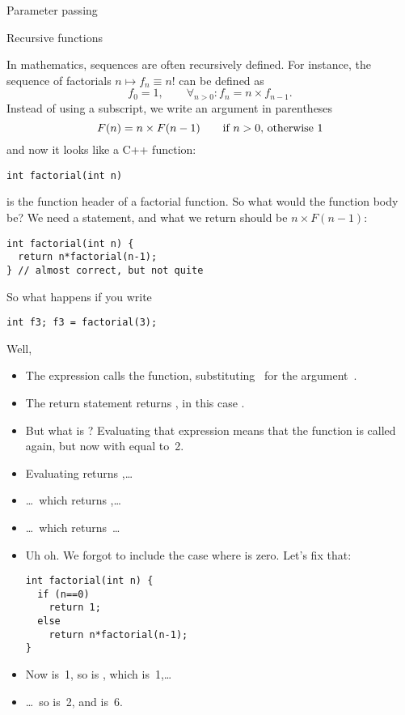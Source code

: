  {Parameter passing}
\label{sec:passing}


 {Recursive functions}
\label{sec:recursion}

In mathematics, sequences are often recursively defined. For instance,
the sequence of factorials $n\mapsto f_n\equiv n!$ can be defined as
\[ f_0=1,\qquad \forall_{n>0}\colon f_n=n\times f_{n-1}. \]
Instead of using a subscript, we write an argument in parentheses
\[ F(n) = n \times F(n-1) \qquad \hbox{if $n>0$, otherwise~$1$} \]
and now it looks like a C++ function:
\begin{verbatim}
int factorial(int n)
\end{verbatim}
is the function header of a factorial function. So what would the
function body be? We need a  statement, and what we return
should be $n \times F(n-1)$:
\begin{verbatim}
int factorial(int n) {
  return n*factorial(n-1);
} // almost correct, but not quite
\end{verbatim}
So what happens if you write
\begin{verbatim}
int f3; f3 = factorial(3);
\end{verbatim}
Well,
\begin{itemize}
\item The expression  calls the 
  function, substituting~ for the argument~.
\item The return statement returns , in this case
  .
\item But what is ? Evaluating that expression means
  that the  function is called again, but now with 
  equal to~2.
\item Evaluating  returns ,\ldots
\item \ldots~which returns ,\ldots
\item \ldots~which returns~\ldots
\item Uh oh. We forgot to include the case where  is zero. Let's
  fix that:
\begin{verbatim}
int factorial(int n) {
  if (n==0)
    return 1;
  else
    return n*factorial(n-1);
}
\end{verbatim}
\item Now  is~1, so  is
  , which is~1,\ldots
\item \ldots~so  is~2, and  is~6.
\end{itemize}

